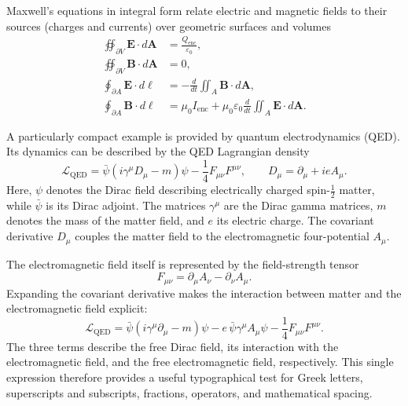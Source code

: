 \documentclass[
11pt,
a4paper,
oneside
]{scrbook}
\begin{document}
Maxwell's equations in integral form relate electric and magnetic fields to their sources (charges and currents) over geometric surfaces and volumes
\begin{align}
	\oiint_{\partial V}
	\mathbf{E}\cdot d\mathbf{A}
	&= \frac{Q_{\mathrm{enc}}}{\varepsilon_0},
	\label{eq:maxwell-int-gauss-electric}
	\\
	\oiint_{\partial V}
	\mathbf{B}\cdot d\mathbf{A}
	&= 0,
	\label{eq:maxwell-int-gauss-magnetic}
	\\
	\oint_{\partial A}
	\mathbf{E}\cdot d\boldsymbol{\ell}
	&= -\frac{d}{dt}
	\iint_A \mathbf{B}\cdot d\mathbf{A},
	\label{eq:maxwell-int-faraday}
	\\
	\oint_{\partial A}
	\mathbf{B}\cdot d\boldsymbol{\ell}
	&= \mu_0 I_{\mathrm{enc}}
	+ \mu_0\varepsilon_0
	\frac{d}{dt}
	\iint_A \mathbf{E}\cdot d\mathbf{A}.
	\label{eq:maxwell-int-ampere}
\end{align}

A particularly compact example is provided by quantum electrodynamics
(QED). Its dynamics can be described by the QED Lagrangian density
\begin{equation}
	\mathcal{L}_{\mathrm{QED}}
	=
	\bar{\psi}
	\left(
	i\gamma^\mu D_\mu - m
	\right)
	\psi
	-
	\frac{1}{4}
	F_{\mu\nu}F^{\mu\nu},
	\qquad
	D_\mu = \partial_\mu + i e A_\mu .
	\label{eq:qed-lagrangian}
\end{equation}
Here, $\psi$ denotes the Dirac field describing electrically charged
spin-$\frac{1}{2}$ matter, while $\bar{\psi}$ is its Dirac adjoint.
The matrices $\gamma^\mu$ are the Dirac gamma matrices, $m$ denotes the
mass of the matter field, and $e$ its electric charge. The covariant
derivative $D_\mu$ couples the matter field to the electromagnetic
four-potential $A_\mu$.

The electromagnetic field itself is represented by the field-strength
tensor
\begin{equation}
	F_{\mu\nu}
	=
	\partial_\mu A_\nu
	-
	\partial_\nu A_\mu .
	\label{eq:electromagnetic-field-tensor}
\end{equation}
Expanding the covariant derivative makes the interaction between matter
and the electromagnetic field explicit:
\begin{equation}
	\mathcal{L}_{\mathrm{QED}}
	=
	\bar{\psi}
	\left(
	i\gamma^\mu \partial_\mu - m
	\right)
	\psi
	-
	e\,\bar{\psi}\gamma^\mu A_\mu\psi
	-
	\frac{1}{4}
	F_{\mu\nu}F^{\mu\nu}.
	\label{eq:qed-lagrangian-expanded}
\end{equation}
The three terms describe the free Dirac field, its interaction with the
electromagnetic field, and the free electromagnetic field, respectively.
This single expression therefore provides a useful typographical test for
Greek letters, superscripts and subscripts, fractions, operators, and
mathematical spacing.
\end{document}
